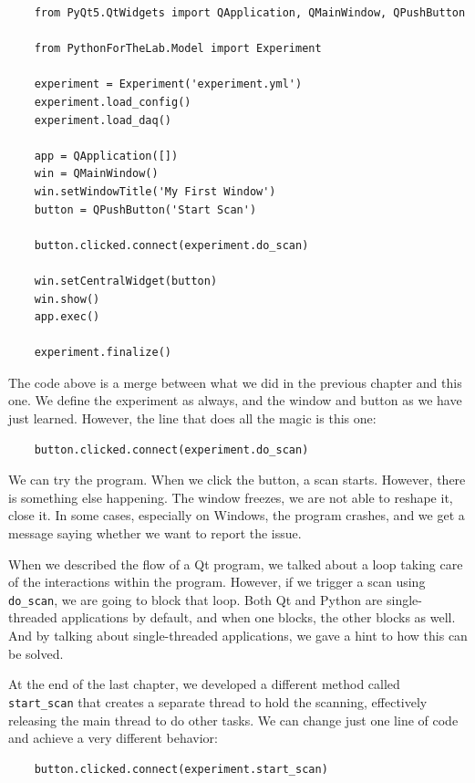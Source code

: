 \begin{verbatim}
    from PyQt5.QtWidgets import QApplication, QMainWindow, QPushButton

    from PythonForTheLab.Model import Experiment

    experiment = Experiment('experiment.yml')
    experiment.load_config()
    experiment.load_daq()

    app = QApplication([])
    win = QMainWindow()
    win.setWindowTitle('My First Window')
    button = QPushButton('Start Scan')

    button.clicked.connect(experiment.do_scan)

    win.setCentralWidget(button)
    win.show()
    app.exec()

    experiment.finalize()
\end{verbatim}

The code above is a merge between what we did in the previous chapter and this one. We define the experiment as always, and the window and button as we have just learned. However, the line that does all the magic is this one:

\begin{verbatim}
    button.clicked.connect(experiment.do_scan)
\end{verbatim}

We can try the program. When we click the button, a scan starts. However, there is something else happening. The window freezes, we are not able to reshape it, close it. In some cases, especially on Windows, the program crashes, and we get a message saying whether we want to report the issue.


When we described the flow of a Qt program, we talked about a loop taking care of the interactions within the program. However, if we trigger a scan using \texttt{do\_scan}, we are going to block that loop. Both Qt and Python are single-threaded applications by default, and when one blocks, the other blocks as well. And by talking about single-threaded applications, we gave a hint to how this can be solved.

At the end of the last chapter, we developed a different method called \texttt{start\_scan} that creates a separate thread to hold the scanning, effectively releasing the main thread to do other tasks. We can change just one line of code and achieve a very different behavior:

\begin{verbatim}
    button.clicked.connect(experiment.start_scan)
\end{verbatim}

